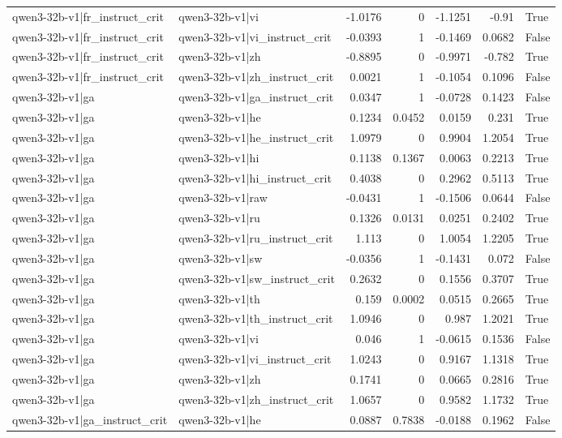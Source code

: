 \begin{table}
\begin{tabular}{l l r r r r l}
qwen3-32b-v1|fr_instruct_crit & qwen3-32b-v1|vi & -1.0176 & 0 & -1.1251 & -0.91 & True \\
qwen3-32b-v1|fr_instruct_crit & qwen3-32b-v1|vi_instruct_crit & -0.0393 & 1 & -0.1469 & 0.0682 & False \\
qwen3-32b-v1|fr_instruct_crit & qwen3-32b-v1|zh & -0.8895 & 0 & -0.9971 & -0.782 & True \\
qwen3-32b-v1|fr_instruct_crit & qwen3-32b-v1|zh_instruct_crit & 0.0021 & 1 & -0.1054 & 0.1096 & False \\
qwen3-32b-v1|ga & qwen3-32b-v1|ga_instruct_crit & 0.0347 & 1 & -0.0728 & 0.1423 & False \\
qwen3-32b-v1|ga & qwen3-32b-v1|he & 0.1234 & 0.0452 & 0.0159 & 0.231 & True \\
qwen3-32b-v1|ga & qwen3-32b-v1|he_instruct_crit & 1.0979 & 0 & 0.9904 & 1.2054 & True \\
qwen3-32b-v1|ga & qwen3-32b-v1|hi & 0.1138 & 0.1367 & 0.0063 & 0.2213 & True \\
qwen3-32b-v1|ga & qwen3-32b-v1|hi_instruct_crit & 0.4038 & 0 & 0.2962 & 0.5113 & True \\
qwen3-32b-v1|ga & qwen3-32b-v1|raw & -0.0431 & 1 & -0.1506 & 0.0644 & False \\
qwen3-32b-v1|ga & qwen3-32b-v1|ru & 0.1326 & 0.0131 & 0.0251 & 0.2402 & True \\
qwen3-32b-v1|ga & qwen3-32b-v1|ru_instruct_crit & 1.113 & 0 & 1.0054 & 1.2205 & True \\
qwen3-32b-v1|ga & qwen3-32b-v1|sw & -0.0356 & 1 & -0.1431 & 0.072 & False \\
qwen3-32b-v1|ga & qwen3-32b-v1|sw_instruct_crit & 0.2632 & 0 & 0.1556 & 0.3707 & True \\
qwen3-32b-v1|ga & qwen3-32b-v1|th & 0.159 & 0.0002 & 0.0515 & 0.2665 & True \\
qwen3-32b-v1|ga & qwen3-32b-v1|th_instruct_crit & 1.0946 & 0 & 0.987 & 1.2021 & True \\
qwen3-32b-v1|ga & qwen3-32b-v1|vi & 0.046 & 1 & -0.0615 & 0.1536 & False \\
qwen3-32b-v1|ga & qwen3-32b-v1|vi_instruct_crit & 1.0243 & 0 & 0.9167 & 1.1318 & True \\
qwen3-32b-v1|ga & qwen3-32b-v1|zh & 0.1741 & 0 & 0.0665 & 0.2816 & True \\
qwen3-32b-v1|ga & qwen3-32b-v1|zh_instruct_crit & 1.0657 & 0 & 0.9582 & 1.1732 & True \\
qwen3-32b-v1|ga_instruct_crit & qwen3-32b-v1|he & 0.0887 & 0.7838 & -0.0188 & 0.1962 & False \\

\end{tabular}
\end{table}
